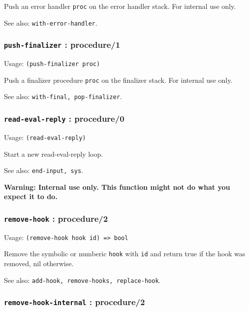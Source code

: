 \documentclass[
]{article}
\newcommand{\passthrough}[1]{#1}
\begin{document}
Push an error handler \passthrough{\lstinline!proc!} on the error
handler stack. For internal use only.

See also: \passthrough{\lstinline!with-error-handler!}.

\hypertarget{push-finalizer-procedure1}{%
\subsubsection{\texorpdfstring{\texttt{push-finalizer} :
procedure/1}{push-finalizer : procedure/1}}\label{push-finalizer-procedure1}}

Usage: \passthrough{\lstinline!(push-finalizer proc)!}

Push a finalizer procedure \passthrough{\lstinline!proc!} on the
finalizer stack. For internal use only.

See also: \passthrough{\lstinline!with-final, pop-finalizer!}.

\hypertarget{read-eval-reply-procedure0}{%
\subsubsection{\texorpdfstring{\texttt{read-eval-reply} :
procedure/0}{read-eval-reply : procedure/0}}\label{read-eval-reply-procedure0}}

Usage: \passthrough{\lstinline!(read-eval-reply)!}

Start a new read-eval-reply loop.

See also: \passthrough{\lstinline!end-input, sys!}.

\textbf{Warning: Internal use only. This function might not do what you
expect it to do.}

\hypertarget{remove-hook-procedure2}{%
\subsubsection{\texorpdfstring{\texttt{remove-hook} :
procedure/2}{remove-hook : procedure/2}}\label{remove-hook-procedure2}}

Usage: \passthrough{\lstinline!(remove-hook hook id) => bool!}

Remove the symbolic or numberic \passthrough{\lstinline!hook!} with
\passthrough{\lstinline!id!} and return true if the hook was removed,
nil otherwise.

See also:
\passthrough{\lstinline!add-hook, remove-hooks, replace-hook!}.

\hypertarget{remove-hook-internal-procedure2}{%
\subsubsection{\texorpdfstring{\texttt{remove-hook-internal} :
procedure/2}{remove-hook-internal : procedure/2}}\label{remove-hook-internal-procedure2}}
\end{document}
